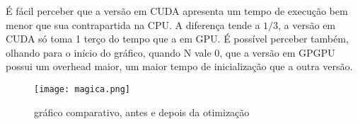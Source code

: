   É fácil perceber que a versão em CUDA apresenta um tempo de execução bem menor que sua contrapartida na CPU. A diferença tende a $1/3$, a versão em CUDA só toma 1 terço do tempo que a em GPU. É possível perceber também, olhando para o início do gráfico, quando N vale 0, que a versão em GPGPU possui um overhead maior, um maior tempo de inicialização que a outra versão.

\begin{figure}[!h]
  \centering
  \texttt{[image: magica.png]}
  \caption{gráfico comparativo, antes e depois da otimização}
  \label{fig:magica}
\end{figure}
